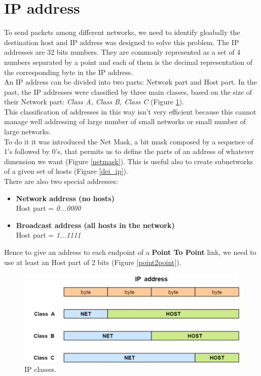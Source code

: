 \section{IP address}\label{ip_section}
To send packets among different networks, we need to identify gloabally the destination host and IP address was designed to solve this problem. The IP addresses are 32 bits numbers. They are commonly represented as a set of 4 numbers separated by a point and each of them is the decimal representation of the corresponding byte in the IP address.\\
An IP address can be divided into two parts: Network part and Host part. In the past, the IP addresses were classified by three main classes, based on the size of their Network part: \textit{Class A, Class B, Class C} (Figure \ref{classes_ip}).\\
This classification of addresses in this way isn't very efficient because this cannot manage well addressing of large number of small networks or small number of large networks.\\
To do it it was introduced the Net Mask, a bit mask composed by a sequence of 1's followed by 0's, that permits us to define the parts of an address of whatever dimension we want (Figure \ref{netmask}). This is useful also to create subnetworks of a given set of hosts (Figure \ref{dei_ip}).\\
There are also two special addresses:
\begin{itemize}
\item{\textbf{Network address (no hosts)}\\
Host part = \textit{0...0000}
}
\item{\textbf{Broadcast address (all hosts in the network)}\\
Host part = \textit{1...1111}
}
\end{itemize}
Hence to give an address to each endpoint of a \textbf{Point To Point} link, we need to use at least an Host part of 2 bits (Figure \ref{point2point}).  
\begin{figure}[h]
\centering
\includegraphics[scale=0.4]{Images/IP/classes_ip}
\caption{\footnotesize{IP classes.}}\label{classes_ip}
\end{figure}
